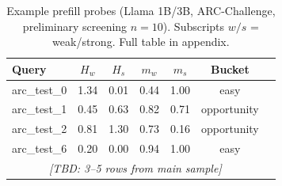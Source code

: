 \begin{table}[t]
  \centering
  \footnotesize
  \begin{tabular}{lcccccc}
    \toprule
    \textbf{Query} & $H_w$ & $H_s$ & $m_w$ & $m_s$ & \textbf{Bucket} \\
    \midrule
    arc\_test\_0 & 1.34 & 0.01 & 0.44 & 1.00 & easy \\
    arc\_test\_1 & 0.45 & 0.63 & 0.82 & 0.71 & opportunity \\
    arc\_test\_2 & 0.81 & 1.30 & 0.73 & 0.16 & opportunity \\
    arc\_test\_6 & 0.20 & 0.00 & 0.94 & 1.00 & easy \\
    \multicolumn{6}{c}{\textit{[TBD: 3--5 rows from main sample]}} \\
    \bottomrule
  \end{tabular}
  \caption{Example prefill probes (Llama 1B/3B, ARC-Challenge, preliminary screening $n{=}10$). Subscripts $w/s$ = weak/strong. Full table in appendix.}
  \label{tab:examples}
\end{table}
